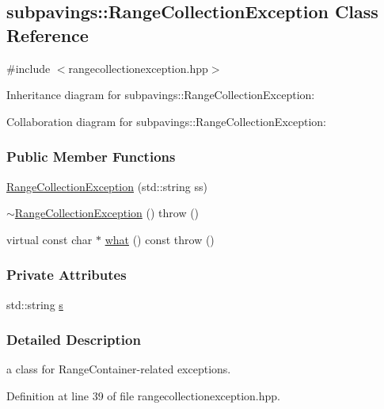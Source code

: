 \hypertarget{classsubpavings_1_1RangeCollectionException}{\subsection{subpavings\-:\-:\-Range\-Collection\-Exception \-Class \-Reference}
\label{classsubpavings_1_1RangeCollectionException}
}


{\ttfamily \#include $<$rangecollectionexception.\-hpp$>$}



\-Inheritance diagram for subpavings\-:\-:\-Range\-Collection\-Exception\-:


\-Collaboration diagram for subpavings\-:\-:\-Range\-Collection\-Exception\-:
\subsubsection*{\-Public \-Member \-Functions}
\begin{DoxyCompactItemize}
\item 
\hyperlink{classsubpavings_1_1RangeCollectionException_a6c650a490421a912d40e1144f7bf492e}{\-Range\-Collection\-Exception} (std\-::string ss)
\item 
\hyperlink{classsubpavings_1_1RangeCollectionException_ad1d65fa032ca1b3f25d1e6252aed9500}{$\sim$\-Range\-Collection\-Exception} ()  throw ()
\item 
virtual const char $\ast$ \hyperlink{classsubpavings_1_1RangeCollectionException_a050eeb5807139b76de360d4ac704c9fe}{what} () const   throw ()
\end{DoxyCompactItemize}
\subsubsection*{\-Private \-Attributes}
\begin{DoxyCompactItemize}
\item 
std\-::string \hyperlink{classsubpavings_1_1RangeCollectionException_a01bfb5e3ed83359d9b011c97a924ec60}{s}
\end{DoxyCompactItemize}


\subsubsection{\-Detailed \-Description}
a class for \-Range\-Container-\/related exceptions. 

\-Definition at line 39 of file rangecollectionexception.\-hpp.



